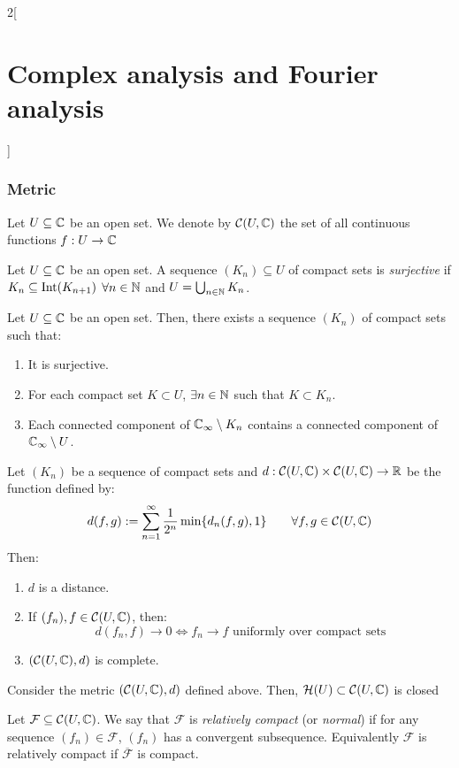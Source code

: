 \documentclass[../../../main.tex]{subfiles}
\begin{document}
\begin{multicols}{2}[\section{Complex analysis and Fourier analysis}]
  \subsubsection{Metric}
  \begin{definition}
    Let $U\subseteq\mathbb{C}$ be an open set. We denote by $\mathcal{C}(U,\mathbb{C})$ the set of all continuous functions $f:U\rightarrow\mathbb{C}$
  \end{definition}
  \begin{definition}
    Let $U\subseteq\mathbb{C}$ be an open set. A sequence $(K_n)\subseteq U$ of compact sets is \emph{surjective} if $K_n\subseteq \operatorname{Int}(K_{n+1})$ $\forall n\in\mathbb{N}$ and $U=\bigcup_{n\in\mathbb{N}}K_n$.
  \end{definition}
  \begin{proposition}
    Let $U\subseteq\mathbb{C}$ be an open set. Then, there exists a sequence $(K_n)$ of compact sets such that:
    \begin{enumerate}
      \item It is surjective.
      \item For each compact set $K\subset U$, $\exists n\in\mathbb{N}$ such that $K\subset K_n$.
      \item Each connected component of $\mathbb{C}_\infty\setminus K_n$ contains a connected component of $\mathbb{C}_\infty\setminus U$.
    \end{enumerate}
  \end{proposition}
  \begin{theorem}
    Let $(K_n)$ be a sequence of compact sets and $d:\mathcal{C}(U,\mathbb{C})\times\mathcal{C}(U,\mathbb{C})\rightarrow\mathbb{R}$ be the function defined by:
    $$d(f,g):=\sum_{n=1}^\infty\frac{1}{2^n}\min\{d_n(f,g),1\}\qquad\forall f,g\in\mathcal{C}(U,\mathbb{C})$$ Then:
    \begin{enumerate}
      \item $d$ is a distance.
      \item If $(f_n),f\in\mathcal{C}(U,\mathbb{C})$, then: $$d(f_n,f)\rightarrow 0\iff f_n\rightarrow f\text{ uniformly over compact sets}$$
      \item $(\mathcal{C}(U,\mathbb{C}),d)$ is complete.
    \end{enumerate}
  \end{theorem}
  \begin{proposition}
    Consider the metric $(\mathcal{C}(U,\mathbb{C}),d)$ defined above. Then, $\mathcal{H}(U)\subset\mathcal{C}(U,\mathbb{C})$ is closed
  \end{proposition}
  \begin{definition}
    Let $\mathcal{F}\subseteq \mathcal{C}(U,\mathbb{C})$. We say that $\mathcal{F}$ is \emph{relatively compact} (or \emph{normal}) if for any sequence $(f_n)\in\mathcal{F}$, $(f_n)$ has a convergent subsequence. Equivalently $\mathcal{F}$ is relatively compact if $\overline{\mathcal{F}}$ is compact.

\end{definition}
\end{multicols}
\end{document}
